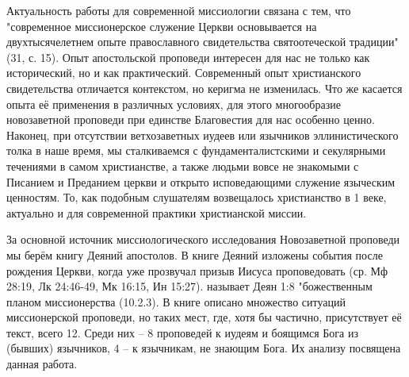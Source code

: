 Актуальность работы для современной миссиологии связана с тем, что "современное миссионерское служение Церкви основывается на двухтысячелетнем опыте православного свидетельства святоотеческой традиции"\cite{@rpc.concepcia} (31, с. 15).
Опыт апостольской проповеди интересен для нас не только как исторический, но и как практический.
Современный опыт христианского свидетельства отличается контекстом, но керигма не изменилась.
Что же касается опыта её применения в различных условиях, для этого многообразие новозаветной проповеди при единстве Благовестия для нас особенно ценно.
Наконец, при отсутствии ветхозаветных иудеев или язычников эллинистического толка в наше время, мы сталкиваемся с фундаменталистскими и секулярными течениями в самом христианстве, а также людьми вовсе не знакомыми с Писанием и Преданием церкви и открыто исповедающими служение языческим ценностям.
То, как подобным слушателям возвещалось христианство в 1 веке, актуально и для современной практики христианской миссии.


За основной источник миссиологического исследования Новозаветной проповеди мы берём книгу Деяний апостолов.
В книге Деяний изложены события после рождения Церкви, когда уже прозвучал призыв Иисуса проповедовать (ср. Мф 28:19, Лк 24:46-49, Мк 16:15, Ин 15:27).
\cite{@brown.vvedenie_1} называет Деян 1:8 "божественным планом миссионерства (10.2.3).
В книге описано множество ситуаций миссионерской проповеди, но таких мест, где, хотя бы частично, присутствует её текст, всего 12.
Среди них – 8 проповедей к иудеям и боящимся Бога из (бывших) язычников, 4 – к язычникам, не знающим Бога.
Их анализу посвящена данная работа.

